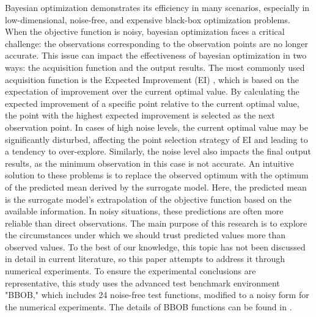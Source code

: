 \documentclass{article}
\begin{document}
\hspace{2em}
Bayesian optimization demonstrates its efficiency in many scenarios, especially in low-dimensional, noise-free, and expensive black-box optimization problems. When the objective function is noisy, bayesian optimization faces a critical challenge: the observations corresponding to the observation points are no longer accurate. This issue can impact the effectiveness of bayesian optimization in two ways: the acquisition function and the output results. The most commonly used acquisition function is the Expected Improvement (EI) \citep{Jones1998Efficient}, which is based on the expectation of improvement over the current optimal value. By calculating the expected improvement of a specific point relative to the current optimal value, the point with the highest expected improvement is selected as the next observation point. In cases of high noise levels, the current optimal value may be significantly disturbed, affecting the point selection strategy of EI and leading to a tendency to over-explore. Similarly, the noise level also impacts the final output results, as the minimum observation in this case is not accurate. An intuitive solution to these problems is to replace the observed optimum with the optimum of the predicted mean derived by the surrogate model. Here, the predicted mean is the surrogate model’s extrapolation of the objective function based on the available information. In noisy situations, these predictions are often more reliable than direct observations. The main purpose of this research is to explore the circumstances under which we should trust predicted values more than observed values. To the best of our knowledge, this topic has not been discussed in detail in current literature, so this paper attempts to address it through numerical experiments. To ensure the experimental conclusions are representative, this study uses the advanced test benchmark environment "BBOB," which includes 24 noise-free test functions, modified to a noisy form for the numerical experiments. The details of BBOB functions can be found in \citep{Hansen2010RealParameterBO}.
\end{document}
